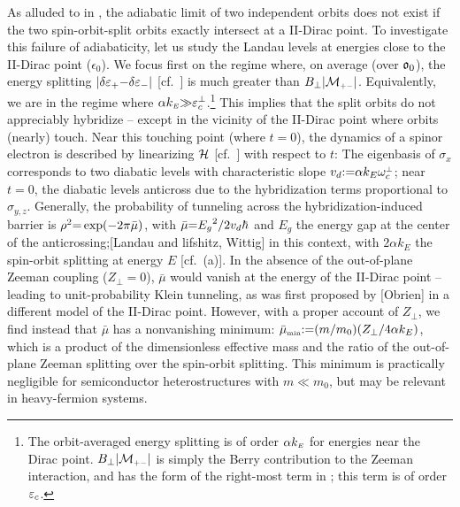 \documentclass[aps, prb, showpacs, twocolumn, notitlepage, superscriptaddress]{revtex4-1}
\begin{document}
As alluded to in , the adiabatic limit of two independent orbits does not exist if the two spin-orbit-split orbits exactly intersect at a II-Dirac point. To investigate this failure of adiabaticity, let us study the Landau levels at energies close to the II-Dirac point ($\epsilon_0$). We focus first on the regime where, on average (over $\mathfrak{o}_0$), the energy splitting $|\delta \varepsilon_+{-}\delta \varepsilon_-|$ [cf.\ ] is much greater than $B_\perp|{\cal M}_{\scriptscriptstyle{+-}}|$. Equivalently, we are in the regime where $\alpha k_{\scriptscriptstyle{E}}{\gg}\varepsilon_c^\perp$.\footnote{The orbit-averaged energy splitting is of order $\alpha k_{\scriptscriptstyle{E}}$ for energies near the Dirac point. $B_\perp|{\cal M}_{\scriptscriptstyle{+-}}|$ is simply the Berry contribution to the Zeeman interaction, and has the form of the right-most term in ; this term is of order $\varepsilon_c$.} This implies that the split orbits do not appreciably hybridize -- except in the vicinity of the II-Dirac point where orbits (nearly) touch.  Near this touching point (where $t{=}0$), the dynamics of a spinor electron is described by linearizing $\mathcal{H}$ [cf.\ ] with respect to $t$:
The eigenbasis of $\sigma_x$ corresponds to two diabatic levels with characteristic slope $v_d{:}{=}\alpha k_E\omega^{\scriptscriptstyle{\perp}}_c$; near $t{=}0$, the diabatic levels anticross  due to the hybridization terms proportional to $\sigma_{y,z}$. Generally, the probability of tunneling across the hybridization-induced barrier is  $\rho^2{=}\exp(-2\pi\bar{\mu})$, with $\bar{\mu}{=}{E_g}^2/{2v_d \hbar}$ and $E_g$ the energy gap at the center of the anticrossing;[Landau and lifshitz, Wittig] in this context,
with $2\alpha k_E$ the spin-orbit splitting at energy $E$ [cf.\ (a)]. In the absence of the out-of-plane Zeeman coupling ($Z_\perp{=}0$), $\bar{\mu}$ would vanish at the energy of the II-Dirac point -- leading to unit-probability Klein tunneling, as was first proposed by [Obrien] in a different model of the II-Dirac point. However, with a proper account of $Z_\perp$, we find instead that $\bar{\mu}$ has a nonvanishing minimum: $\bar{\mu}_{\scriptscriptstyle{\text{min}}}{:}{=} ( m/m_0)(Z_\perp/4\alpha k_{E})$, which is a product of the dimensionless effective mass and the ratio of the out-of-plane Zeeman splitting over the spin-orbit splitting. This minimum is practically negligible for  semiconductor heterostructures with $m{\ll}m_0$, but may be relevant in heavy-fermion systems. 
\end{document}
